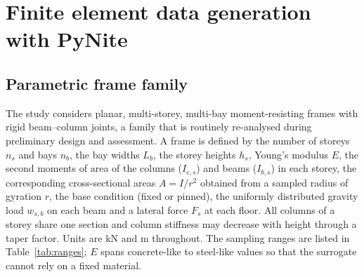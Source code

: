 \section{Finite element data generation with PyNite}\label{sec:data}

\subsection{Parametric frame family}
The study considers planar, multi-storey, multi-bay moment-resisting frames with rigid beam--column joints, a family that is routinely re-analysed during preliminary design and assessment. A frame is defined by the number of storeys $n_s$ and bays $n_b$, the bay widths $L_b$, the storey heights $h_s$, Young's modulus $E$, the second moments of area of the columns ($I_{c,s}$) and beams ($I_{b,s}$) in each storey, the corresponding cross-sectional areas $A = I/r^2$ obtained from a sampled radius of gyration $r$, the base condition (fixed or pinned), the uniformly distributed gravity load $w_{s,b}$ on each beam and a lateral force $F_s$ at each floor. All columns of a storey share one section and column stiffness may decrease with height through a taper factor. Units are kN and m throughout. The sampling ranges are listed in Table~\ref{tab:ranges}; $E$ spans concrete-like to steel-like values so that the surrogate cannot rely on a fixed material.

